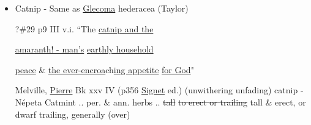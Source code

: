 \documentclass[a4paper,10pt]{article}
\begin{document}
\begin{flushleft}
\begin{itemize}
\item Catnip - Same as \underline{Glecoma} hederacea (Taylor)\par
{}
?\#29 p9 III v.i. ``The \ul{catnip and the} \par
\ul{amaranth! - man's} \ul{earthly household} \par
\ul{peace} \& \ul{the ever-encroa}ch\ul{ing appetite} \ul{for God}"\par
{}
Melville, \ul{Pierre} Bk xxv IV (p356 \ul{Signet} ed.)
\color{red}
(unwithering
unfading) %
\color{red}
catnip - N\'epeta %
Catmint .. per. \& ann. herbs .. \sout{tall}
\sout{to erect or trailing} tall \& erect, or dwarf trailing, generally (over)
\end{itemize}
\end{flushleft}
\end{document}
